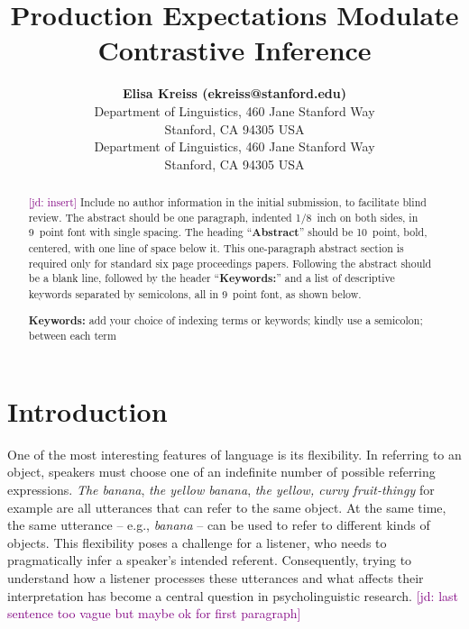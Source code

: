\documentclass[10pt,letterpaper]{article}
\title{Production Expectations Modulate Contrastive Inference}
\author{{\large \bf Elisa Kreiss (ekreiss@stanford.edu)} \\
  Department of Linguistics, 460 Jane Stanford Way \\
  Stanford, CA 94305 USA
  \AND {\large \bf Judith Degen (jdegen@stanford.edu)} \\
  Department of Linguistics, 460 Jane Stanford Way \\
  Stanford, CA 94305 USA}
\newcommand{\jd}[1]{\textcolor{Purple}{[jd: #1]}}
\begin{document}
\maketitle

\begin{abstract}
\jd{insert}
Include no author information in the initial submission, to facilitate
blind review.  The abstract should be one paragraph, indented 1/8~inch on both sides,
in 9~point font with single spacing. The heading ``{\bf Abstract}''
should be 10~point, bold, centered, with one line of space below
it. This one-paragraph abstract section is required only for standard
six page proceedings papers. Following the abstract should be a blank
line, followed by the header ``{\bf Keywords:}'' and a list of
descriptive keywords separated by semicolons, all in 9~point font, as
shown below.

\textbf{Keywords:} 
add your choice of indexing terms or keywords; kindly use a
semicolon; between each term
\end{abstract}

\section{Introduction}

One of the most interesting features of language is its flexibility. In referring to an object, speakers must choose one of an indefinite number of possible referring expressions. \textit{The banana}, \textit{the yellow banana}, \textit{the yellow, curvy fruit-thingy} for example are all utterances that can refer to the same object. At the same time, the same utterance -- e.g., \emph{banana} -- can be used to refer to different kinds of objects. This flexibility poses a challenge for a listener, who needs to pragmatically infer a speaker's intended referent. Consequently, trying to understand how a listener processes these utterances and what affects their interpretation has become a central question in psycholinguistic research. \jd{last sentence too vague but maybe ok for first paragraph}
\end{document}
